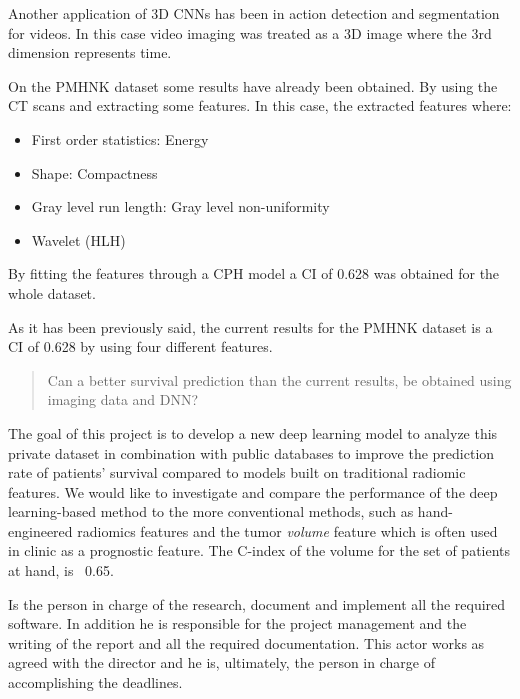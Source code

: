 Another application of 3D \glspl{CNN} has been in action detection and segmentation for videos.
In this case video imaging was treated as a 3D image where the 3rd dimension represents
time.
~\cite{neural:3d-cnn-action-detection}

On the \gls{PMHNK} dataset some results have already been obtained. By using the \gls{CT} scans and
extracting some features. In this case, the extracted features where:
\begin{itemize}
  \item First order statistics: Energy
  \item Shape: Compactness
  \item Gray level run length: Gray level non-uniformity
  \item Wavelet (HLH) 
\end{itemize}
By fitting the features through a \gls{CPH} model a \gls{CI} of 0.628 was obtained for the whole
dataset.
~\cite{medical:ct-based-radiomic-signature}


As it has been previously said, the current results for the \gls{PMHNK} dataset is a \gls{CI}
of 0.628 \cite{medical:ct-based-radiomic-signature} by using four different features. 

\begin{quotation}
  Can a better survival prediction than the current results, be obtained using imaging data and
  \gls{DNN}?
\end{quotation}


The goal of this project is to develop a new deep learning model to analyze this private 
dataset in combination with public databases to improve the prediction rate of patients' 
survival compared to models built on traditional radiomic features. We would like to 
investigate and compare the performance of the deep learning-based method 
to the more conventional methods, such as hand-engineered radiomics features and the tumor 
\emph{volume} feature which is often used in clinic as a prognostic feature. The C-index 
of the volume for the set of patients at hand, is ~0.65.


Is the person in charge of the research, document and implement all the required software.
In addition he is responsible for the project management and the writing of the report
and all the required documentation. This actor works as agreed with the director and
he is, ultimately, the person in charge of accomplishing the deadlines.

